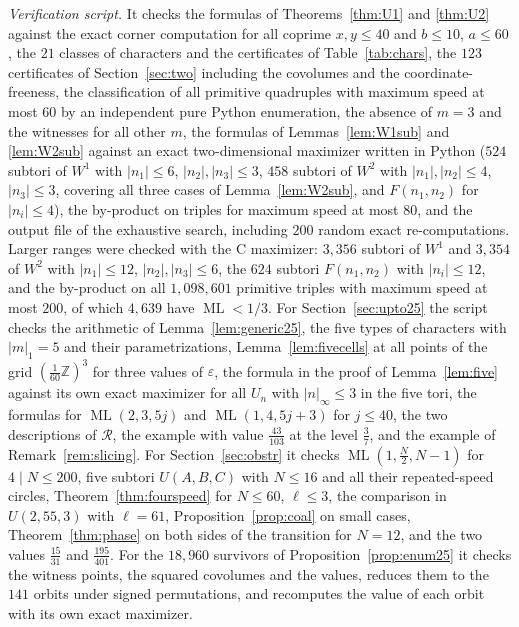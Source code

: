 \documentclass[12pt]{amsart}
\theoremstyle{definition}\newtheorem{definition}[theorem]{Definition}
\theoremstyle{remark}\newtheorem{remark}[theorem]{Remark}
\newcommand{\Z}{\mathbb Z}\newcommand{\R}{\mathbb R}\newcommand{\T}{\mathbb T}
\newcommand{\ML}{\operatorname{ML}}
\newcommand{\supn}[1]{\lvert #1\rvert_\infty}
\newcommand{\Wone}{W^{1}}\newcommand{\Wtwo}{W^{2}}
\begin{document}
\emph{Verification script.} It checks the formulas of Theorems~\ref{thm:U1} and \ref{thm:U2} against the exact corner computation for all coprime $x,y\le 40$ and $b\le 10$, $a\le 60$, the $21$ classes of characters and the certificates of Table~\ref{tab:chars}, the $123$ certificates of Section~\ref{sec:two} including the covolumes and the coordinate-freeness, the classification of all primitive quadruples with maximum speed at most $60$ by an independent pure Python enumeration, the absence of $m=3$ and the witnesses for all other $m$, the formulas of Lemmas~\ref{lem:W1sub} and \ref{lem:W2sub} against an exact two-dimensional maximizer written in Python ($524$ subtori of $\Wone$ with $|n_1|\le6$, $|n_2|,|n_3|\le3$, $458$ subtori of $\Wtwo$ with $|n_1|,|n_2|\le4$, $|n_3|\le3$, covering all three cases of Lemma~\ref{lem:W2sub}, and $F(n_1,n_2)$ for $|n_i|\le4$), the by-product on triples for maximum speed at most $80$, and the output file of the exhaustive search, including $200$ random exact re-computations. Larger ranges were checked with the C maximizer: $3{,}356$ subtori of $\Wone$ and $3{,}354$ of $\Wtwo$ with $|n_1|\le12$, $|n_2|,|n_3|\le6$, the $624$ subtori $F(n_1,n_2)$ with $|n_i|\le12$, and the by-product on all $1{,}098{,}601$ primitive triples with maximum speed at most $200$, of which $4{,}639$ have $\ML<1/3$. For Section~\ref{sec:upto25} the script checks the arithmetic of Lemma~\ref{lem:generic25}, the five types of characters with $|m|_1=5$ and their parametrizations, Lemma~\ref{lem:fivecells} at all points of the grid $(\frac1{60}\Z)^3$ for three values of $\varepsilon$, the formula in the proof of Lemma~\ref{lem:five} against its own exact maximizer for all $U_n$ with $\supn n\le3$ in the five tori, the formulas for $\ML(2,3,5j)$ and $\ML(1,4,5j+3)$ for $j\le40$, the two descriptions of $\mathcal R$, the example with value $\frac{43}{103}$ at the level $\frac37$, and the example of Remark~\ref{rem:slicing}. For Section~\ref{sec:obstr} it checks $\ML(1,\frac N2,N-1)$ for $4\mid N\le200$, five subtori $U(A,B,C)$ with $N\le16$ and all their repeated-speed circles, Theorem~\ref{thm:fourspeed} for $N\le60$, $\ell\le3$, the comparison in $U(2,55,3)$ with $\ell=61$, Proposition~\ref{prop:coal} on small cases, Theorem~\ref{thm:phase} on both sides of the transition for $N=12$, and the two values $\frac{15}{31}$ and $\frac{195}{401}$. For the $18{,}960$ survivors of Proposition~\ref{prop:enum25} it checks the witness points, the squared covolumes and the values, reduces them to the $141$ orbits under signed permutations, and recomputes the value of each orbit with its own exact maximizer.
\end{document}
